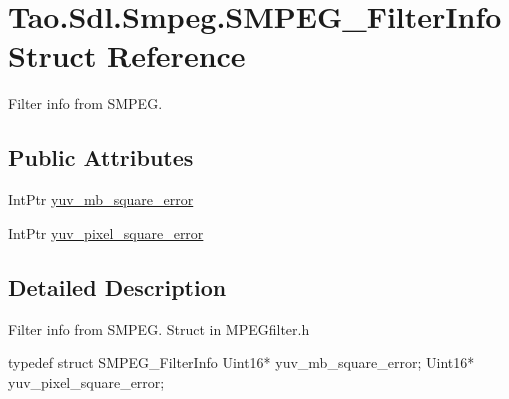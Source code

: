 \hypertarget{struct_tao_1_1_sdl_1_1_smpeg_1_1_s_m_p_e_g___filter_info}{
\section{Tao.Sdl.Smpeg.SMPEG\_\-FilterInfo Struct Reference}
\label{struct_tao_1_1_sdl_1_1_smpeg_1_1_s_m_p_e_g___filter_info}
}


Filter info from SMPEG.  


\subsection*{Public Attributes}
\begin{DoxyCompactItemize}
\item 
IntPtr \hyperlink{struct_tao_1_1_sdl_1_1_smpeg_1_1_s_m_p_e_g___filter_info_a5263a9c2264eb157db7f6ef9039277ae}{yuv\_\-mb\_\-square\_\-error}
\item 
IntPtr \hyperlink{struct_tao_1_1_sdl_1_1_smpeg_1_1_s_m_p_e_g___filter_info_aa3dadb3c2c02385ae034e63565e6d07e}{yuv\_\-pixel\_\-square\_\-error}
\end{DoxyCompactItemize}


\subsection{Detailed Description}
Filter info from SMPEG. Struct in MPEGfilter.h 
\begin{DoxyCode}
                    typedef struct SMPEG_FilterInfo {
                                Uint16* yuv_mb_square_error;
                                Uint16* yuv_pixel_square_error;
                        }
\end{DoxyCode}
  

